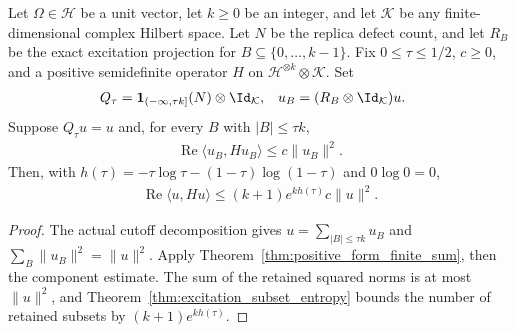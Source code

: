 \begin{theorem}
  \label{thm:replica_cutoff_component_bound}
  \leanok
  Let $\Omega\in\mathcal H$ be a unit vector, let $k\ge0$ be an integer,
  and let $\mathcal K$ be any finite-dimensional complex Hilbert space.
  Let $N$ be the replica defect count, and let $R_B$ be the exact
  excitation projection for $B\subseteq\{0,\ldots,k-1\}$.
  Fix $0\le\tau\le1/2$, $c\ge0$, and a positive semidefinite operator
  $H$ on $\mathcal H^{\otimes k}\otimes\mathcal K$. Set
  \begin{align}
    Q_\tau&=\mathbf1_{(-\infty,\tau k]}(N)\otimes \Id_{\mathcal K},
    &u_B&=(R_B\otimes \Id_{\mathcal K})u.
  \end{align}
  Suppose $Q_\tau u=u$ and, for every $B$ with $|B|\le\tau k$,
  \begin{align}
    \operatorname{Re}\langle u_B,Hu_B\rangle\le c\|u_B\|^2.
  \end{align}
  Then, with $h(\tau)=-\tau\log\tau-(1-\tau)\log(1-\tau)$ and
  $0\log0=0$,
  \begin{align}
    \operatorname{Re}\langle u,Hu\rangle
      \le (k+1)e^{kh(\tau)}c\|u\|^2.
  \end{align}
\end{theorem}
\begin{proof}
  \leanok
  The actual cutoff decomposition gives $u=\sum_{|B|\le\tau k}u_B$
  and $\sum_B\|u_B\|^2=\|u\|^2$. Apply
  Theorem~\ref{thm:positive_form_finite_sum}, then the component estimate.
  The sum of the retained squared norms is at most $\|u\|^2$, and
  Theorem~\ref{thm:excitation_subset_entropy} bounds the number of retained
  subsets by $(k+1)e^{kh(\tau)}$.
\end{proof}

